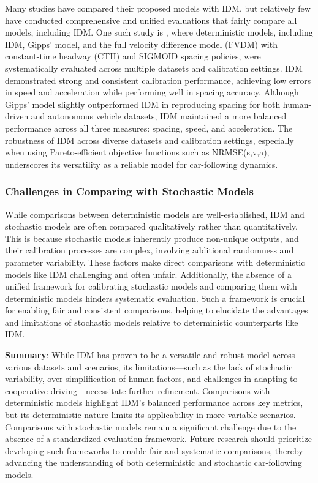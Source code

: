 \documentclass[a4paper,fleqn]{cas-sc}
\begin{document}
Many studies have compared their proposed models with IDM, but relatively few have conducted comprehensive and unified evaluations that fairly compare all models, including IDM. One such study is \cite{punzoCalibrationCarFollowingDynamicsAutomated2021}, where deterministic models, including IDM, Gipps' model, and the full velocity difference model (FVDM) with constant-time headway (CTH) and SIGMOID spacing policies, were systematically evaluated across multiple datasets and calibration settings. IDM demonstrated strong and consistent calibration performance, achieving low errors in speed and acceleration while performing well in spacing accuracy. Although Gipps' model slightly outperformed IDM in reproducing spacing for both human-driven and autonomous vehicle datasets, IDM maintained a more balanced performance across all three measures: spacing, speed, and acceleration. The robustness of IDM across diverse datasets and calibration settings, especially when using Pareto-efficient objective functions such as NRMSE(s,v,a), underscores its versatility as a reliable model for car-following dynamics.

\subsubsection{Challenges in Comparing with Stochastic Models}

While comparisons between deterministic models are well-established, IDM and stochastic models are often compared qualitatively rather than quantitatively. This is because stochastic models inherently produce non-unique outputs, and their calibration processes are complex, involving additional randomness and parameter variability. These factors make direct comparisons with deterministic models like IDM challenging and often unfair. Additionally, the absence of a unified framework for calibrating stochastic models and comparing them with deterministic models hinders systematic evaluation. Such a framework is crucial for enabling fair and consistent comparisons, helping to elucidate the advantages and limitations of stochastic models relative to deterministic counterparts like IDM.

\textbf{Summary}: While IDM has proven to be a versatile and robust model across various datasets and scenarios, its limitations—such as the lack of stochastic variability, over-simplification of human factors, and challenges in adapting to cooperative driving—necessitate further refinement. Comparisons with deterministic models highlight IDM’s balanced performance across key metrics, but its deterministic nature limits its applicability in more variable scenarios. Comparisons with stochastic models remain a significant challenge due to the absence of a standardized evaluation framework. Future research should prioritize developing such frameworks to enable fair and systematic comparisons, thereby advancing the understanding of both deterministic and stochastic car-following models.
\end{document}
